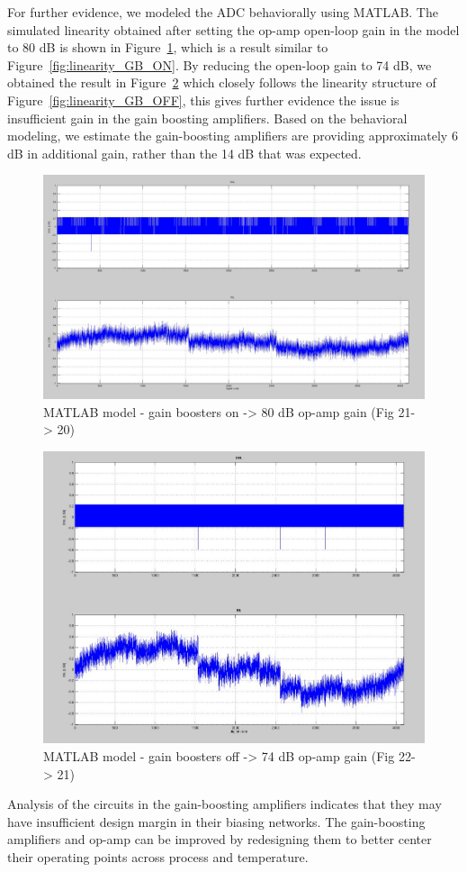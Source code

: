 For further evidence, we modeled the ADC behaviorally using MATLAB. The simulated linearity obtained after setting the op-amp open-loop gain in the model to 80 dB is shown in Figure~\ref{fig:behav_GB_ON}, which is a result similar to Figure~\ref{fig:linearity_GB_ON}. By reducing the open-loop gain to 74 dB, we obtained the result in Figure~\ref{fig:behav_GB_OFF} which closely follows the linearity structure of Figure~\ref{fig:linearity_GB_OFF}, this gives further evidence the issue is insufficient gain in the gain boosting amplifiers. Based on the behavioral modeling, we estimate the gain-boosting amplifiers are providing approximately 6 dB in additional gain, rather than the 14 dB that was expected.
\begin{figure}[h!]
\centering
  \includegraphics[width=0.6\linewidth]{figures/prakash_fig/behav_GB_ON.JPG}
  \caption{MATLAB model - gain boosters on -> 80 dB op-amp gain (Fig 21-> 20)}
  \label{fig:behav_GB_ON}
\end{figure}

\begin{figure}[h!]
\centering
  \includegraphics[width=0.6\linewidth]{figures/prakash_fig/behav_GB_OFF.JPG}
  \caption{MATLAB model - gain boosters off -> 74 dB op-amp gain (Fig 22-> 21)}
  \label{fig:behav_GB_OFF}
\end{figure}
Analysis of the circuits in the gain-boosting amplifiers indicates that they may have insufficient design margin in their biasing networks. The gain-boosting amplifiers and op-amp can be improved by redesigning them to better center their operating points across process and temperature.

